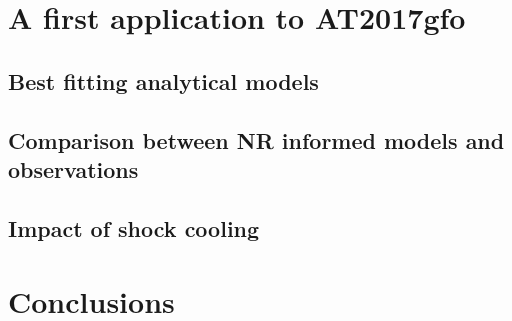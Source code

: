 \documentclass[fleqn,usenatbib]{mnras}
\begin{document}
\section{A first application to AT2017gfo}
\subsection{Best fitting analytical models}
\subsection{Comparison between NR informed models and observations}
\subsection{Impact of shock cooling}

\section{Conclusions}





\bsp	%
\label{lastpage}
\end{document}
